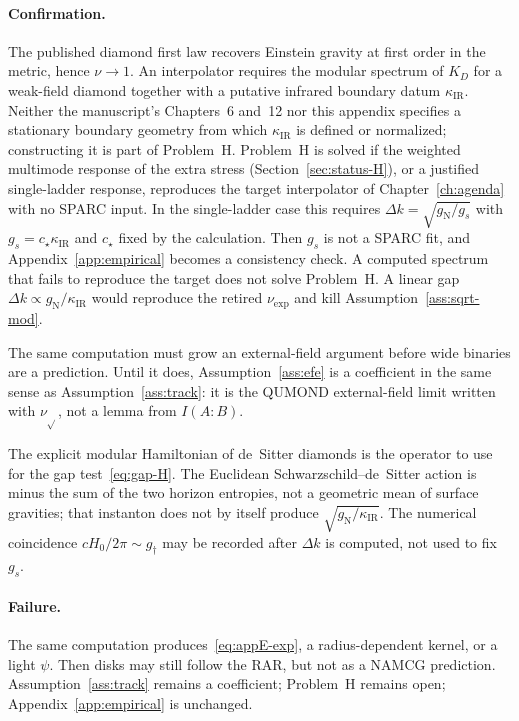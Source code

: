 \paragraph{Confirmation.}
The published diamond first law recovers Einstein gravity
at first order in the metric, hence \(\nu\to 1\).
An interpolator requires the modular spectrum of \(K_D\) for a
weak-field diamond together with a putative infrared boundary datum
\(\kappa_{\mathrm{IR}}\). Neither the manuscript's Chapters~6 and~12
nor this appendix specifies a stationary boundary geometry from which
\(\kappa_{\mathrm{IR}}\) is defined or normalized; constructing it is
part of Problem~H.
Problem~H is solved if the weighted multimode response of the extra
stress (Section~\ref{sec:status-H}), or a justified single-ladder
response, reproduces the target interpolator of
Chapter~\ref{ch:agenda} with no SPARC input. In the single-ladder case
this requires \(\Delta k=\sqrt{g_{\mathrm{N}}/g_s}\) with
\(g_s=c_\star\kappa_{\mathrm{IR}}\) and \(c_\star\) fixed by the
calculation. Then \(g_s\) is not a SPARC fit, and
Appendix~\ref{app:empirical} becomes a consistency check. A computed
spectrum that fails to reproduce the target does not solve Problem~H.
A linear gap \(\Delta k\propto g_{\mathrm{N}}/\kappa_{\mathrm{IR}}\)
would reproduce the retired
\(\nu_{\mathrm{exp}}\) and kill
Assumption~\ref{ass:sqrt-mod}.

The same computation must grow an external-field argument
before wide binaries are a prediction. Until it does,
Assumption~\ref{ass:efe} is a coefficient in the same sense as
Assumption~\ref{ass:track}: it is the QUMOND external-field limit written
with \(\nu_{\sqrt{}}\), not a lemma from \(I(A:B)\).

The explicit modular Hamiltonian of de~Sitter diamonds
\cite{Frob2023dS} is the operator to use for the
gap test~\eqref{eq:gap-H}.
The Euclidean Schwarzschild--de~Sitter action is minus
the sum of the two horizon entropies, not a geometric
mean of surface gravities; that instanton does not
by itself produce \(\sqrt{g_{\mathrm{N}}/\kappa_{\mathrm{IR}}}\).
The numerical coincidence
\(cH_0/2\pi\sim g_\dagger\) may be recorded after
\(\Delta k\) is computed, not used to fix \(g_s\).

\paragraph{Failure.}
The same computation produces~\eqref{eq:appE-exp}, a
radius-dependent kernel, or a light \(\psi\). Then disks
may still follow the RAR, but not as a NAMCG prediction.
Assumption~\ref{ass:track} remains a coefficient; Problem~H
remains open; Appendix~\ref{app:empirical} is unchanged.

